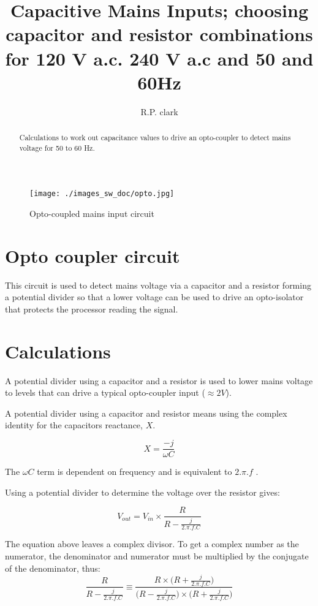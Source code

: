 \documentclass[a4paper,10pt]{article}
\title{Capacitive Mains Inputs; choosing capacitor and resistor combinations for 120 V a.c. 240 V a.c and 50 and 60Hz}
\author{R.P. clark}
\begin{document}
\maketitle

\begin{abstract}
Calculations to work out capacitance values to drive an opto-coupler to detect mains voltage
for 50 to 60 Hz.
\end{abstract}
\begin{figure}[h]
 \centering
 \texttt{[image: ./images\_sw\_doc/opto.jpg]}
 \caption{Opto-coupled mains input circuit}
 \label{fig:opto}
\end{figure}

\section{Opto coupler circuit}

This circuit is used to detect mains voltage via a capacitor and a resistor
forming a potential divider so that a lower voltage can be used to drive an opto-isolator
that protects the processor reading the signal.



\section{Calculations}

A potential divider using a capacitor and a resistor is used to lower mains voltage
to levels that can drive a typical opto-coupler input ($\approx 2V$).

A potential divider using a capacitor and resistor means
using the complex identity for the capacitors reactance, $X$.

$$ X = \frac{-j}{\omega C } $$
 
The ${\omega C }$ term is dependent on frequency and is equivalent to $2.\pi.f$ .

Using a potential divider to determine the voltage over the resistor gives:

$$ V_{out} = V_{in} \times \frac{R}{R-\frac{j}{2.\pi.f.C}} $$


The equation above leaves a complex divisor.
To get a complex number as the numerator, the denominator and numerator must be multiplied by
the  conjugate of the denominator, thus:
$$\frac{R}{R-\frac{j}{2.\pi.f.C}} \equiv  \frac{R \times \Big({R+\frac{j}{2.\pi.f.C}}\Big) }{\Big({R-\frac{j}{2.\pi.f.C}}\Big) \times \Big({R+\frac{j}{2.\pi.f.C}}\Big) } $$  
\end{document}
